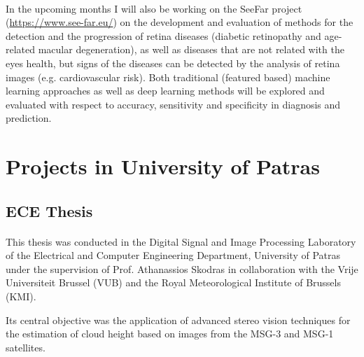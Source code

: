 \documentclass{article}
\begin{document}
\paragraph{}
In the upcoming months I will also be working on the SeeFar project (\url{https://www.see-far.eu/}) on the development and evaluation of methods for the detection and the progression of retina diseases (diabetic retinopathy and  age-related macular degeneration), as well as diseases that are not related with the eyes health, but signs of the diseases can be detected by the analysis of retina images (e.g. cardiovascular risk). Both traditional (featured based) machine learning approaches as well as deep learning methods will be explored and evaluated  with respect to accuracy, sensitivity and specificity in diagnosis and prediction.

\section{Projects in University of Patras}

\subsection{ECE Thesis}
\paragraph{}
This thesis was conducted in the Digital Signal and Image Processing Laboratory of the Electrical and Computer Engineering Department, University of Patras under the supervision of Prof. Athanassios Skodras in collaboration with the Vrije Universiteit Brussel (VUB) and the Royal Meteorological Institute of Brussels (KMI). \vspace{4pt}

Its central objective was the application of advanced stereo vision techniques for the estimation of cloud height based on images from the MSG-3 and MSG-1 satellites. \vspace{4pt}
\end{document}
